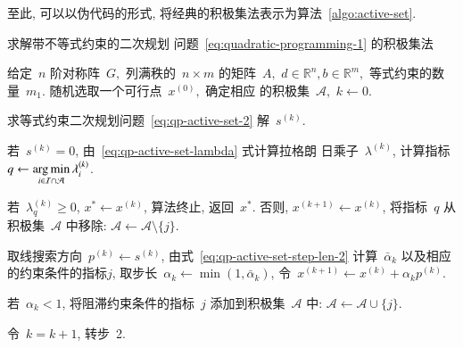 至此, 可以以伪代码的形式, 将经典的积极集法表示为算法~\ref{algo:active-set}.
\begin{algorithm}[htbp]
\caption{求解带不等式约束的二次规划
问题~\eqref{eq:quadratic-programming-1} 的积极集法}\label{algo:active-set}
\begin{algorithmic}[1]
\STATE 给定~$n$ 阶对称阵~$G,$ 列满秩的~$n \times m$ 的矩阵~$A,$ ${d} \in \mathbb{R}^n, {b} \in \mathbb{R}^m,$ 等式约束的数量~$m_1$. 随机选取一个可行点~${x}^{(0)},$ 确定相应
的积极集~$\mathcal{A},$ $k \gets 0.$

\STATE 求等式约束二次规划问题~\eqref{eq:qp-active-set-2} 解~${s}^{(k)}$.

\STATE 若~${s}^{(k)} = 0$, 由~\eqref{eq:qp-active-set-lambda} 式计算拉格朗
日乘子~${\lambda}^{(k)}$, 计算指标~$q \gets \operatorname*{arg\,min}\limits_{i \in \mathcal{I} \cap \mathcal{A}} \lambda_i^{(k)}$.

\STATE 若~$\lambda^{(k)}_q \geqslant 0$, ${x}^* \gets {x}^{(k)}$, 算法终止, 返回~${x}^*$. 否则, ${x}^{(k+1)} \gets {x}^{(k)}$, 将指标~$q$ 从积极集~$\mathcal{A}$ 中移除: $\mathcal{A} \gets \mathcal{A} \setminus \{ j \}$.

\STATE 取线搜索方向~${p}^{(k)} \gets {s}^{(k)}$, 由式~\eqref{eq:qp-active-set-step-len-2}
计算~$\bar{\alpha}_k$ 以及相应的约束条件的指标$j$, 取步长~$\alpha_k \gets \min (1, \bar{\alpha}_k)$, 令~${x}^{(k+1)} \gets {x}^{(k)} + \alpha_k {p}^{(k)}$.


\STATE 若~$\alpha_k < 1$, 将阻滞约束条件的指标~$j$ 添加到积极集~$\mathcal{A}$ 中: $\mathcal{A} \gets \mathcal{A} \cup \{ j \}$.

\STATE 令~$k=k+1$, 转步~2.
\end{algorithmic}
\end{algorithm}

